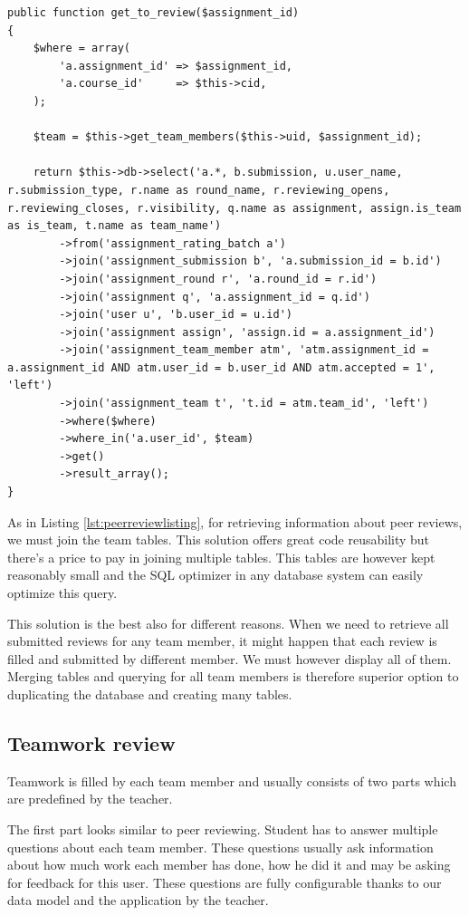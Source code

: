 \begin{lstlisting}[caption={Retrieving information about peer reviews},label={lst:peerreviewlisting}]
public function get_to_review($assignment_id)
{
    $where = array(
        'a.assignment_id' => $assignment_id,
        'a.course_id'     => $this->cid,
    );

    $team = $this->get_team_members($this->uid, $assignment_id);

    return $this->db->select('a.*, b.submission, u.user_name, r.submission_type, r.name as round_name, r.reviewing_opens, r.reviewing_closes, r.visibility, q.name as assignment, assign.is_team as is_team, t.name as team_name')
        ->from('assignment_rating_batch a')
        ->join('assignment_submission b', 'a.submission_id = b.id')
        ->join('assignment_round r', 'a.round_id = r.id')
        ->join('assignment q', 'a.assignment_id = q.id')
        ->join('user u', 'b.user_id = u.id')
        ->join('assignment assign', 'assign.id = a.assignment_id')
        ->join('assignment_team_member atm', 'atm.assignment_id = a.assignment_id AND atm.user_id = b.user_id AND atm.accepted = 1', 'left')
        ->join('assignment_team t', 't.id = atm.team_id', 'left')
        ->where($where)
        ->where_in('a.user_id', $team)
        ->get()
        ->result_array();
}
\end{lstlisting}

As in Listing \ref{lst:peerreviewlisting}, for retrieving information about peer reviews, we must join the team tables. This solution offers great code reusability but there's a price to pay in joining multiple tables. This tables are however kept reasonably small and the SQL optimizer in any database system can easily optimize this query.

This solution is the best also for different reasons. When we need to retrieve all submitted reviews for any team member, it might happen that each review is filled and submitted by different member. We must however display all of them. Merging tables and querying for all team members is therefore superior option to duplicating the database and creating many tables.  

\subsection{Teamwork review}
\label{sec:teamreview}
Teamwork is filled by each team member and usually consists of two parts which are predefined by the teacher. 

The first part looks similar to peer reviewing. Student has to answer multiple questions about each team member. These questions usually ask information about how much work each member has done, how he did it and may be asking for feedback for this user. These questions are fully configurable thanks to our data model and the application by the teacher.

